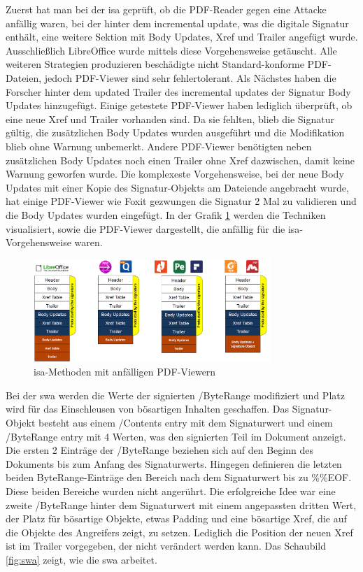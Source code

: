 Zuerst hat man bei der \gls{isa} geprüft, ob die PDF-Reader gegen eine Attacke anfällig waren, bei der hinter dem incremental update, was die digitale Signatur enthält, eine weitere Sektion mit Body Updates, Xref und Trailer angefügt wurde. Ausschließlich LibreOffice wurde mittels diese Vorgehensweise getäuscht. Alle weiteren Strategien produzieren beschädigte nicht Standard-konforme PDF-Dateien, jedoch PDF-Viewer sind sehr fehlertolerant. Als Nächstes haben die Forscher hinter dem updated Trailer des incremental updates der Signatur Body Updates hinzugefügt. Einige getestete PDF-Viewer haben lediglich überprüft, ob eine neue Xref und Trailer vorhanden sind. Da sie fehlten, blieb die Signatur gültig, die zusätzlichen Body Updates wurden ausgeführt und die Modifikation blieb ohne Warnung unbemerkt. Andere PDF-Viewer benötigten neben zusätzlichen Body Updates noch einen Trailer ohne Xref dazwischen, damit keine Warnung geworfen wurde. Die komplexeste Vorgehensweise, bei der neue Body Updates mit einer Kopie des Signatur-Objekts am Dateiende angebracht wurde, hat einige PDF-Viewer wie Foxit gezwungen die Signatur 2 Mal zu validieren und die Body Updates wurden eingefügt. \cite{ccc-break-pdf} In der Grafik \ref{fig:isa} werden die Techniken visualisiert, sowie die PDF-Viewer dargestellt, die anfällig für die \gls{isa}-Vorgehensweise waren.
\par

\begin{figure}[!htb]
	\centering
	\includegraphics[width=0.8\textwidth]{"images/isa.png"}
	\caption{\gls{isa}-Methoden mit anfälligen PDF-Viewern \cite{ccc-break-pdf-slides}}
	\label{fig:isa}
\end{figure}

Bei der \gls{swa} werden die Werte der signierten /ByteRange modifiziert und Platz wird für das Einschleusen von bösartigen Inhalten geschaffen. Das Signatur-Objekt besteht aus einem /Contents entry mit dem Signaturwert und einem /ByteRange entry mit 4 Werten, was den signierten Teil im Dokument anzeigt. Die ersten 2 Einträge der /ByteRange beziehen sich auf den Beginn des Dokuments bis zum Anfang des Signaturwerts. Hingegen definieren die letzten beiden ByteRange-Einträge den Bereich nach dem Signaturwert bis zu \%\%EOF. Diese beiden Bereiche wurden nicht angerührt. Die erfolgreiche Idee war eine zweite /ByteRange hinter dem Signaturwert mit einem angepassten dritten Wert, der Platz für bösartige Objekte, etwas Padding und eine bösartige Xref, die auf die Objekte des Angreifers zeigt, zu setzen. Lediglich die Position der neuen Xref ist im Trailer vorgegeben, der nicht verändert werden kann. \cite{ccc-break-pdf} Das Schaubild \ref{fig:swa} zeigt, wie die \gls{swa} arbeitet.
\par

